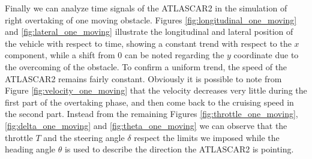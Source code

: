 Finally we can analyze time signals of the ATLASCAR2 in the simulation of right overtaking of one moving obstacle. Figures \ref{fig:longitudinal_one_moving} and \ref{fig:lateral_one_moving} illustrate the longitudinal and lateral position of the vehicle with respect to time, showing a constant trend with respect to the $x$ component, while a shift from 0 can be noted regarding the $y$ coordinate due to the overcoming of the obstacle. 
To confirm a uniform trend, the speed of the ATLASCAR2 remains fairly constant. Obviously it is possible to note from Figure \ref{fig:velocity_one_moving} that the velocity decreases very little during the first part of the overtaking phase, and then come back to the cruising speed in the second part. Instead from the remaining Figures \ref{fig:throttle_one_moving}, \ref{fig:delta_one_moving} and \ref{fig:theta_one_moving} we can observe that the throttle $T$ and the steering angle $\delta$ respect the limits we imposed while the heading angle $\theta$ is used to describe the direction the ATLASCAR2 is pointing.
